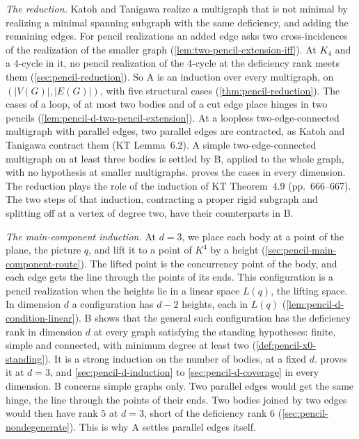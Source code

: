 \emph{The reduction.} Katoh and Tanigawa realize a multigraph that is
not minimal by realizing a minimal spanning subgraph with the same
deficiency, and adding the remaining edges. For pencil realizations an
added edge asks two cross-incidences of the realization of the smaller
graph (\cref{lem:two-pencil-extension-iff}). At $K_4$ and a $4$-cycle in
it, no pencil realization of the $4$-cycle at the deficiency rank meets
them (\cref{sec:pencil-reduction}). So A is an induction over every
multigraph, on $(|V(G)|, |E(G)|)$, with five structural cases
(\cref{thm:pencil-reduction}). The cases of a loop, of at most two
bodies and of a cut edge place hinges in two pencils
(\cref{lem:pencil-d-two-pencil-extension}). At a loopless
two-edge-connected multigraph with parallel edges, two parallel edges
are contracted, as Katoh and Tanigawa contract them (KT Lemma~6.2). A
simple two-edge-connected multigraph on at least three bodies is settled
by B, applied to the whole graph, with no hypothesis at smaller
multigraphs.  proves the cases in every
dimension. The reduction plays the role of the induction of KT
Theorem~4.9 (pp.~666--667). The two steps of that induction, contracting
a proper rigid subgraph and splitting off at a vertex of degree two,
have their counterparts in B.

\emph{The main-component induction.} At $d = 3$, we place each body at a
point of the plane, the picture $q$, and lift it to a point of $K^4$ by
a height (\cref{sec:pencil-main-component-route}). The lifted point is
the concurrency point of the body, and each edge gets the line through
the points of its ends. This configuration is a pencil realization when
the heights lie in a linear space $L(q)$, the lifting space. In
dimension $d$ a configuration has $d - 2$ heights, each in $L(q)$
(\cref{lem:pencil-d-condition-linear}). B shows that the general such
configuration has the deficiency rank in dimension $d$ at every graph
satisfying the standing hypotheses: finite, simple and connected, with
minimum degree at least two (\cref{def:pencil-x0-standing}). It is a
strong induction on the number of bodies, at a fixed $d$.
 proves it at $d = 3$, and
\cref{sec:pencil-d-induction} to \cref{sec:pencil-d-coverage} in every
dimension. B concerns simple graphs only. Two parallel edges would get
the same hinge, the line through the points of their ends. Two bodies
joined by two edges would then have rank $5$ at $d = 3$, short of the
deficiency rank $6$ (\cref{sec:pencil-nondegenerate}). This is why A
settles parallel edges itself.

